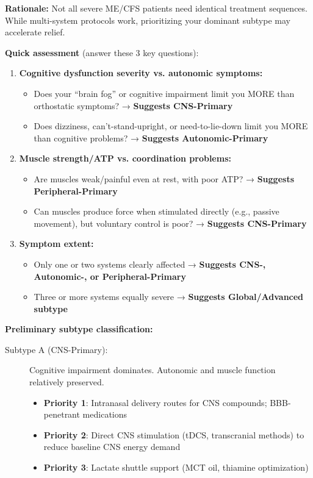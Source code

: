 \begin{recommendation}
\label{rec:subtype-stratification}

\textbf{Rationale:} Not all severe ME/CFS patients need identical treatment sequences. While multi-system protocols work, prioritizing your dominant subtype may accelerate relief.

\textbf{Quick assessment} (answer these 3 key questions):

\begin{enumerate}
    \item \textbf{Cognitive dysfunction severity vs. autonomic symptoms:}
    \begin{itemize}
        \item Does your ``brain fog'' or cognitive impairment limit you MORE than orthostatic symptoms? → \textbf{Suggests CNS-Primary}
        \item Does dizziness, can't-stand-upright, or need-to-lie-down limit you MORE than cognitive problems? → \textbf{Suggests Autonomic-Primary}
    \end{itemize}

    \item \textbf{Muscle strength/ATP vs. coordination problems:}
    \begin{itemize}
        \item Are muscles weak/painful even at rest, with poor ATP? → \textbf{Suggests Peripheral-Primary}
        \item Can muscles produce force when stimulated directly (e.g., passive movement), but voluntary control is poor? → \textbf{Suggests CNS-Primary}
    \end{itemize}

    \item \textbf{Symptom extent:}
    \begin{itemize}
        \item Only one or two systems clearly affected → \textbf{Suggests CNS-, Autonomic-, or Peripheral-Primary}
        \item Three or more systems equally severe → \textbf{Suggests Global/Advanced subtype}
    \end{itemize}
\end{enumerate}

\textbf{Preliminary subtype classification:}

\begin{description}
    \item[Subtype A (CNS-Primary):] Cognitive impairment dominates. Autonomic and muscle function relatively preserved.
    \begin{itemize}
        \item \textbf{Priority 1}: Intranasal delivery routes for CNS compounds; BBB-penetrant medications
        \item \textbf{Priority 2}: Direct CNS stimulation (tDCS, transcranial methods) to reduce baseline CNS energy demand
        \item \textbf{Priority 3}: Lactate shuttle support (MCT oil, thiamine optimization)
    \end{itemize}


\end{description}
\end{recommendation}
